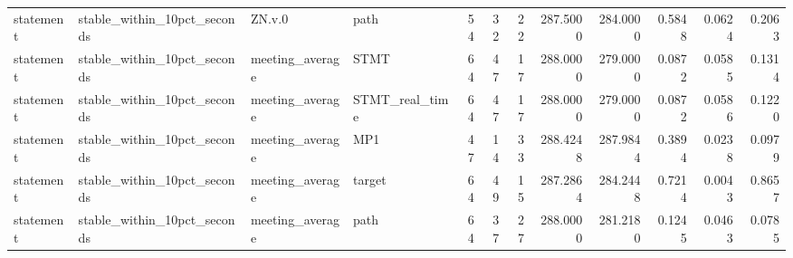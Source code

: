 \begin{tabular}{llllrrrrrrrr}
statement & stable_within_10pct_seconds & ZN.v.0 & path & 54 & 32 & 22 & 287.5000 & 284.0000 & 0.5848 & 0.0624 & 0.2063 \\
statement & stable_within_10pct_seconds & meeting_average & STMT & 64 & 47 & 17 & 288.0000 & 279.0000 & 0.0872 & 0.0585 & 0.1314 \\
statement & stable_within_10pct_seconds & meeting_average & STMT_real_time & 64 & 47 & 17 & 288.0000 & 279.0000 & 0.0872 & 0.0586 & 0.1220 \\
statement & stable_within_10pct_seconds & meeting_average & MP1 & 47 & 14 & 33 & 288.4248 & 287.9844 & 0.3894 & 0.0238 & 0.0979 \\
statement & stable_within_10pct_seconds & meeting_average & target & 64 & 49 & 15 & 287.2864 & 284.2448 & 0.7214 & 0.0043 & 0.8657 \\
statement & stable_within_10pct_seconds & meeting_average & path & 64 & 37 & 27 & 288.0000 & 281.2180 & 0.1245 & 0.0463 & 0.0785 \\
\bottomrule
\end{tabular}
